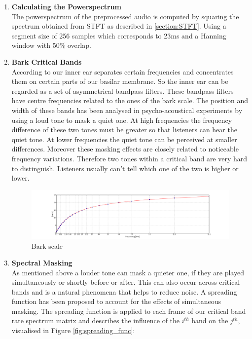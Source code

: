 \documentclass[cic,tc,english]{iiufrgs}
\begin{document}
\begin{enumerate}

\item \textbf{Calculating the Powerspectrum} \\ The powerspectrum of the preprocessed audio is computed by squaring the spectrum obtained from STFT as described in \ref{section:STFT}.  Using a segment size of 256 samples which corresponds to 23ms and a Hanning window with 50\% overlap.

\item \textbf{Bark Critical Bands} \\ According to \cite{fastl2007psychoacoustics} our inner ear separates certain frequencies and concentrates them on certain parts of our basilar membrane. So the inner ear can be regarded as a set of asymmetrical bandpass filters. These bandpass filters have centre frequencies related to the ones of the bark scale. The position and width of these bands has been analysed in psycho-acoustical experiments by using a loud tone to mask a quiet one. At high frequencies the frequency difference of these two tones must be greater so that listeners can hear the quiet tone. At lower frequencies the quiet tone can be perceived at smaller differences. Moreover these masking effects are closely related to noticeable frequency variations. Therefore two tones within a critical band are very hard to distinguish. Listeners usually can't tell which one of the two is higher or lower. %

\begin{figure}
    \caption{Bark scale}
    \begin{center}
        \includegraphics[width=\linewidth]{bark}
    \end{center}
    \label{fig:bark}
\end{figure}

\item \textbf{Spectral Masking} \\ As mentioned above a louder tone can mask a quieter one, if they are played simultaneously or shortly before or after. This can also occur across critical bands and is a natural phenomena that helps to reduce noise. A spreading function has been proposed to account for the effects of simultaneous masking\cite{schroeder1979optimizing, pampalk2001islands}. The spreading function is applied to each frame of our critical band rate spectrum matrix and describes the influence of the $i^{th}$ band on the $j^{th}$, visualised in Figure \ref{fig:spreading_func}: 


\end{enumerate}
\end{document}
